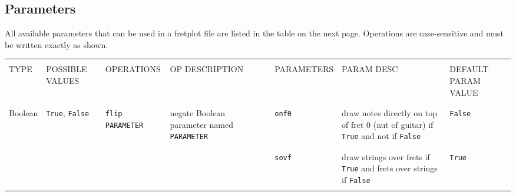 \documentclass[12pt,letterpaper]{article}
\begin{document}
\subsection{Parameters}

All available parameters that can be used in a fretplot file are listed in the table on the next page. Operations are case-sensitive and must be written exactly as shown.

\begin{table}[H]\tiny\hspace{-2.5cm}\begin{tabular}{|l|p{1.5cm}|l|p{2.5cm}|p{1pt}|l|p{2.5cm}|l|}
\hline

&&&&&&&\\
TYPE & POSSIBLE VALUES & OPERATIONS & OP DESCRIPTION & & PARAMETERS & PARAM DESC & DEFAULT PARAM VALUE\\
&&&&&&&\\

\hline

&&&&&&&\\
Boolean & \texttt{True}, \texttt{False} & \texttt{flip PARAMETER} & negate Boolean parameter named \texttt{PARAMETER} & & \texttt{onf0} & draw notes directly on top of fret 0 (nut of guitar) if \texttt{True} and not if \texttt{False}&\texttt{False}\\
&&&&&&&\\
\cline{6-8}
&&&&&&&\\
&&&&&\texttt{sovf}& draw strings over frets if \texttt{True} and frets over strings if \texttt{False}&\texttt{True}\\
&&&&&&&\\

\hline


\end{tabular}
\end{table}
\end{document}
